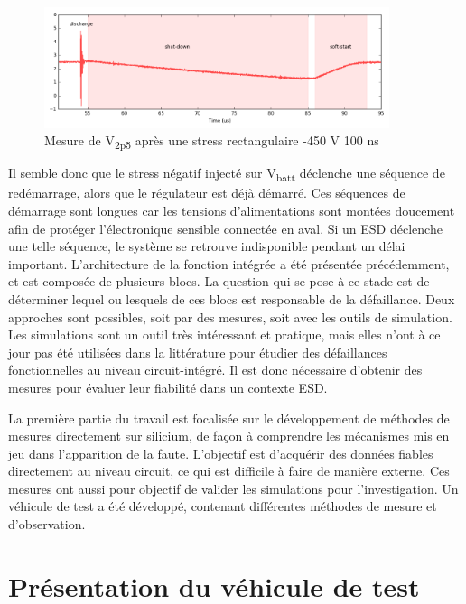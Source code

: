 \begin{figure}[!h]
  \centering
  \includegraphics[width=0.9\textwidth]{src/1/figures/v2p5_measure.png}
  \caption{Mesure de V\textsubscript{2p5} après une stress rectangulaire -450 V 100 ns}
  \label{fig:meas-reset-v2p5}
\end{figure}

Il semble donc que le stress négatif injecté sur V\textsubscript{batt} déclenche une séquence de redémarrage, alors que le régulateur est déjà démarré.
Ces séquences de démarrage sont longues car les tensions d'alimentations sont montées doucement afin de protéger l'électronique sensible connectée en aval.
Si un ESD déclenche une telle séquence, le système se retrouve indisponible pendant un délai important.
L'architecture de la fonction intégrée a été présentée précédemment, et est composée de plusieurs blocs.
La question qui se pose à ce stade est de déterminer lequel ou lesquels de ces blocs est responsable de la défaillance.
Deux approches sont possibles, soit par des mesures, soit avec les outils de simulation.
Les simulations sont un outil très intéressant et pratique, mais elles n'ont à ce jour pas été utilisées dans la littérature pour étudier des défaillances fonctionnelles au niveau circuit-intégré.
Il est donc nécessaire d'obtenir des mesures pour évaluer leur fiabilité dans un contexte ESD.

La première partie du travail est focalisée sur le développement de méthodes de mesures directement sur silicium, de façon à comprendre les mécanismes mis en jeu dans l'apparition de la faute.
L'objectif est d'acquérir des données fiables directement au niveau circuit, ce qui est difficile à faire de manière externe.
Ces mesures ont aussi pour objectif de valider les simulations pour l'investigation.
Un véhicule de test a été développé, contenant différentes méthodes de mesure et d'observation.

\section{Présentation du véhicule de test}

